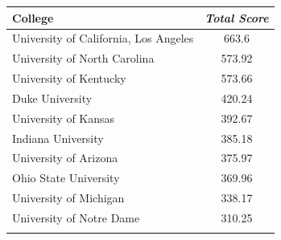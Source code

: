 \documentclass[10pt,a4paper,twocolumn]{article}
\begin{document}
\begin{table}[t]
\begin{tabular}{lc}
	\end{tabular}
	
	\begin{tabular}{lc}
		College & \textit{Total Score}  \\
		\hline
		University of California, Los Angeles & 663.6\\
		University of North Carolina & 573.92\\
		University of Kentucky & 573.66\\
		Duke University & 420.24\\
		University of Kansas & 392.67\\
		Indiana University & 385.18\\
		University of Arizona & 375.97\\
		Ohio State University & 369.96\\
		University of Michigan & 338.17\\
		University of Notre Dame & 310.25\\
		&\\
		
	\end{tabular}
	
\end{table}
\end{document}
